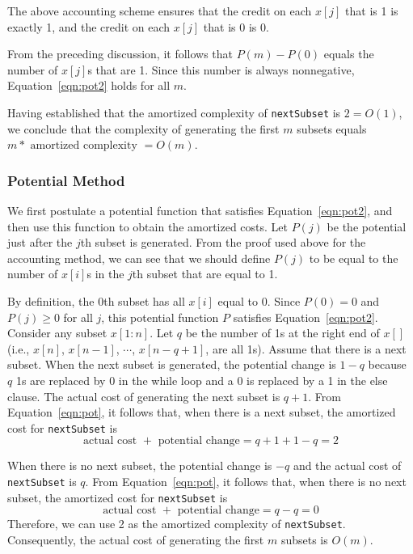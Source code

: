 The above accounting scheme ensures that the credit on each
$x[j]$ that is 
1 is exactly
1, and the credit on each
$x[j]$
that is
0 is
0. 

From the preceding
discussion, it follows that
$P(m) - P(0)$
equals the number of
$x[j]$s that are
1. Since this number
is always nonnegative,
Equation~\ref{eqn:pot2} holds for all $m$.

Having established that the amortized complexity of {\tt nextSubset}
is $2 = O(1)$, we conclude that the complexity
of generating the first $m$ subsets
equals $m * \mbox{ amortized complexity } = O(m)$.

\subsubsection*{Potential Method}
We first postulate a potential function that satisfies Equation~\ref{eqn:pot2},
and then use this function to
obtain the amortized costs. Let $P(j)$
be the potential just after the $j$th
subset is generated.
From the proof used above for the accounting method,
we can see that we should define
$P(j)$ to be equal to the number of $x[i]$s
in the $j$th subset that are equal to
1.

By definition, the
0th subset has all $x[i]$
equal to 0. Since $P(0) = 0$ and
$P(j) \geq 0$ for all $j$,
this potential function $P$ satisfies Equation~\ref{eqn:pot2}.
Consider any subset $x[1:n]$.
Let $q$ be the number of 1s
at the right end of $x[]$ (i.e., $x[n]$,
$x[n-1]$, $\cdots$, $x[n-q+1]$, are all 1s).
Assume that there is a next subset.
When the next subset is generated,
the potential change
is $1-q$ because $q$ 1s are
replaced by 0 in the while
loop and a 0 is replaced by a 1
in the else clause.
The actual cost of generating the next subset is $q+1$.
From Equation~\ref{eqn:pot}, it follows that, when there is a next subset,
the amortized cost for {\tt nextSubset}
is
$$\mbox{actual cost } + \mbox{ potential change}
= q + 1 + 1 - q
= 2$$

When there is no next subset,
the potential change
is $-q$
and the actual cost of {\tt nextSubset} is $q$.
From Equation~\ref{eqn:pot}, it follows that, when there is no next subset,
the amortized cost for {\tt nextSubset}
is
$$\mbox{actual cost } + \mbox{ potential change}
= q - q
= 0$$
Therefore, we can use 2 as the amortized complexity
of {\tt nextSubset}. Consequently, the actual cost of
generating the first $m$ subsets is
$O(m)$.

